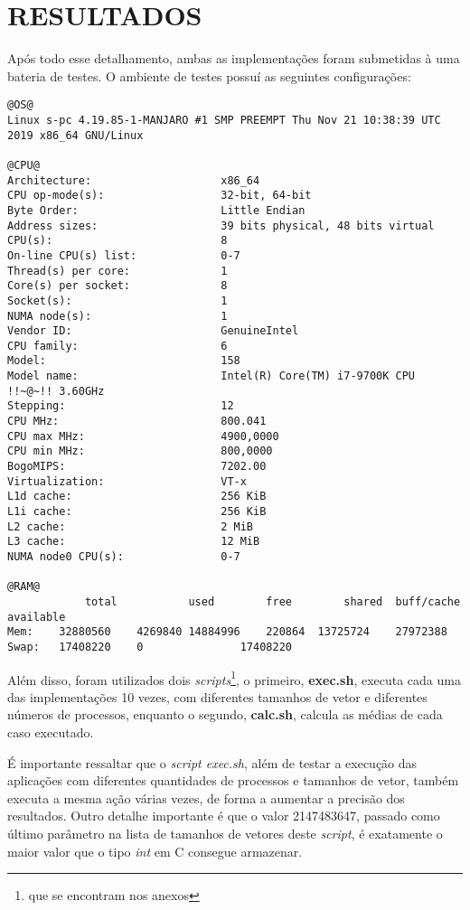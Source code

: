 \section{\normalsize RESULTADOS}
	Após todo esse detalhamento, ambas as implementações foram submetidas à uma bateria de testes. O ambiente de testes possuí as seguintes configurações:
	
\begin{lstlisting}[frame=single,style=base]
@OS@
Linux s-pc 4.19.85-1-MANJARO #1 SMP PREEMPT Thu Nov 21 10:38:39 UTC 2019 x86_64 GNU/Linux

@CPU@
Architecture:                    x86_64
CPU op-mode(s):                  32-bit, 64-bit
Byte Order:                      Little Endian
Address sizes:                   39 bits physical, 48 bits virtual
CPU(s):                          8
On-line CPU(s) list:             0-7
Thread(s) per core:              1
Core(s) per socket:              8
Socket(s):                       1
NUMA node(s):                    1
Vendor ID:                       GenuineIntel
CPU family:                      6
Model:                           158
Model name:                      Intel(R) Core(TM) i7-9700K CPU !!~@~!! 3.60GHz
Stepping:                        12
CPU MHz:                         800.041
CPU max MHz:                     4900,0000
CPU min MHz:                     800,0000
BogoMIPS:                        7202.00
Virtualization:                  VT-x
L1d cache:                       256 KiB
L1i cache:                       256 KiB
L2 cache:                        2 MiB
L3 cache:                        12 MiB
NUMA node0 CPU(s):               0-7

@RAM@
			total			used		free		shared	buff/cache	available
Mem:	32880560	4269840	14884996	220864	13725724	27972388
Swap:	17408220	0				17408220
\end{lstlisting}

	Além disso, foram utilizados dois \textit{scripts}\footnote{que se encontram nos anexos}, o primeiro, \textbf{exec.sh}, executa cada uma das implementações 10 vezes, com diferentes tamanhos de vetor e diferentes números de processos, enquanto o segundo, \textbf{calc.sh}, calcula as médias de cada caso executado.
	
	É importante ressaltar que o \textit{script exec.sh}, além de testar a execução das aplicações com diferentes quantidades de processos e tamanhos de vetor, também executa a mesma ação várias vezes, de forma a aumentar a precisão dos resultados. Outro detalhe importante é que o valor 2147483647, passado como último parâmetro na lista de tamanhos de vetores deste \textit{script}, é exatamente o maior valor que o tipo \textit{int} em C consegue armazenar.
	
